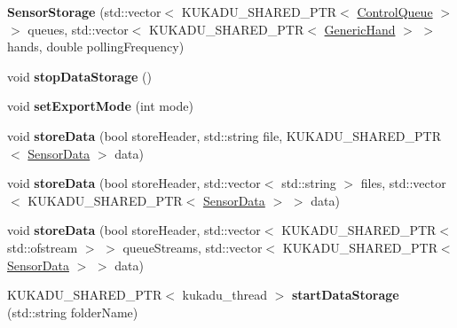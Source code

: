 \begin{DoxyCompactItemize}
\item 
\hypertarget{classkukadu_1_1SensorStorage_a08a91e75da152f2194e573cd9915f609}{{\bfseries Sensor\-Storage} (std\-::vector$<$ K\-U\-K\-A\-D\-U\-\_\-\-S\-H\-A\-R\-E\-D\-\_\-\-P\-T\-R$<$ \hyperlink{classkukadu_1_1ControlQueue}{Control\-Queue} $>$ $>$ queues, std\-::vector$<$ K\-U\-K\-A\-D\-U\-\_\-\-S\-H\-A\-R\-E\-D\-\_\-\-P\-T\-R$<$ \hyperlink{classkukadu_1_1GenericHand}{Generic\-Hand} $>$ $>$ hands, double polling\-Frequency)}\label{classkukadu_1_1SensorStorage_a08a91e75da152f2194e573cd9915f609}

\item 
\hypertarget{classkukadu_1_1SensorStorage_aadec9c676bea6c4f817cd4de8e57ad54}{void {\bfseries stop\-Data\-Storage} ()}\label{classkukadu_1_1SensorStorage_aadec9c676bea6c4f817cd4de8e57ad54}

\item 
\hypertarget{classkukadu_1_1SensorStorage_acbdfa07aa2e4997ad6e5491861fc5821}{void {\bfseries set\-Export\-Mode} (int mode)}\label{classkukadu_1_1SensorStorage_acbdfa07aa2e4997ad6e5491861fc5821}

\item 
\hypertarget{classkukadu_1_1SensorStorage_af139ac656f258cfa38b200e5daa8bef0}{void {\bfseries store\-Data} (bool store\-Header, std\-::string file, K\-U\-K\-A\-D\-U\-\_\-\-S\-H\-A\-R\-E\-D\-\_\-\-P\-T\-R$<$ \hyperlink{classkukadu_1_1SensorData}{Sensor\-Data} $>$ data)}\label{classkukadu_1_1SensorStorage_af139ac656f258cfa38b200e5daa8bef0}

\item 
\hypertarget{classkukadu_1_1SensorStorage_ab9d6af653b8aa0822f80c6278ca2f093}{void {\bfseries store\-Data} (bool store\-Header, std\-::vector$<$ std\-::string $>$ files, std\-::vector$<$ K\-U\-K\-A\-D\-U\-\_\-\-S\-H\-A\-R\-E\-D\-\_\-\-P\-T\-R$<$ \hyperlink{classkukadu_1_1SensorData}{Sensor\-Data} $>$ $>$ data)}\label{classkukadu_1_1SensorStorage_ab9d6af653b8aa0822f80c6278ca2f093}

\item 
\hypertarget{classkukadu_1_1SensorStorage_ae327ec5a25cb995598c0a04fd2675074}{void {\bfseries store\-Data} (bool store\-Header, std\-::vector$<$ K\-U\-K\-A\-D\-U\-\_\-\-S\-H\-A\-R\-E\-D\-\_\-\-P\-T\-R$<$ std\-::ofstream $>$ $>$ queue\-Streams, std\-::vector$<$ K\-U\-K\-A\-D\-U\-\_\-\-S\-H\-A\-R\-E\-D\-\_\-\-P\-T\-R$<$ \hyperlink{classkukadu_1_1SensorData}{Sensor\-Data} $>$ $>$ data)}\label{classkukadu_1_1SensorStorage_ae327ec5a25cb995598c0a04fd2675074}

\item 
\hypertarget{classkukadu_1_1SensorStorage_ab68803e1c9d13b0431cf7635137e3c6b}{K\-U\-K\-A\-D\-U\-\_\-\-S\-H\-A\-R\-E\-D\-\_\-\-P\-T\-R$<$ kukadu\-\_\-thread $>$ {\bfseries start\-Data\-Storage} (std\-::string folder\-Name)}\label{classkukadu_1_1SensorStorage_ab68803e1c9d13b0431cf7635137e3c6b}

\end{DoxyCompactItemize}
